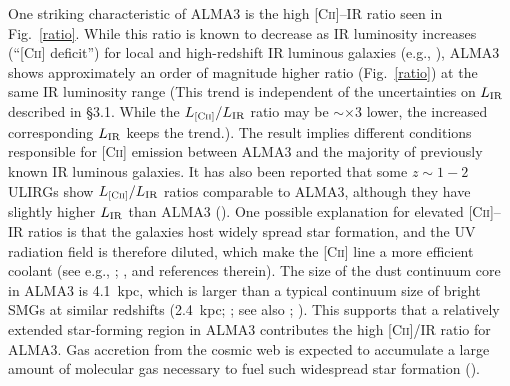 \documentclass[apj]{emulateapj}
\begin{document}
One striking characteristic of ALMA3 is the high \textsc{[Cii]}--IR ratio seen in Fig.~\ref{ratio}.
While this ratio is known to decrease as IR luminosity increases (``\textsc{[Cii]} deficit'') for local and high-redshift IR luminous galaxies (e.g., \citealt{2013ApJ...774...68D}), ALMA3 shows approximately an order of magnitude higher ratio (Fig.~\ref{ratio}) at the same IR luminosity range
(This trend is independent of the uncertainties on $L_{\rm IR}$ described in \S 3.1. 
While the $L_\textsc{[Cii]}/L_{\rm IR}$ ratio may be $\sim\times$3 lower, the increased corresponding $L_{\rm IR}$ keeps the trend.).
The result implies different conditions responsible for \textsc{[Cii]} emission between ALMA3 and the majority of previously known IR luminous galaxies.
It has also been reported that some $z\sim1-2$ ULIRGs show $L_\textsc{[Cii]}/L_{\rm IR}$ ratios comparable to ALMA3, although they have slightly higher $L_{\rm IR}$ than ALMA3 (\citealt{2015ApJ...799...13B}).
One possible explanation for elevated \textsc{[Cii]}--IR ratios is that the galaxies host widely spread star formation, and the UV radiation field is therefore diluted, which make the \textsc{[Cii]} line a more efficient coolant (see e.g., \citealt{2015A&A...574A..14C}; \citealt{2015ApJ...799...13B}, and references therein).
The size of the dust continuum core in ALMA3 is 4.1~kpc, which
is larger than a typical continuum size of bright SMGs at similar redshifts (2.4~kpc; \citealt{2015ApJ...799...81S}; see also \citealt{2015ApJ...810..133I}; \citealt{2016arXiv161109857U}). 
This supports that a relatively extended star-forming region in ALMA3 contributes the high \textsc{[Cii]}/IR ratio for ALMA3.
Gas accretion from the cosmic web is expected to accumulate a large amount of molecular gas necessary to fuel such widespread star formation (\citealt{2015ApJ...799...13B}).
\end{document}
